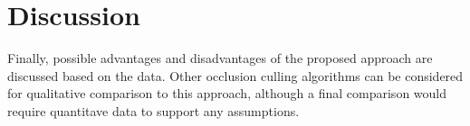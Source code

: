 \chapter{Discussion} \label{cpt-discussion}

Finally, possible advantages and disadvantages of the proposed approach are discussed based on the data.
Other occlusion culling algorithms can be considered for qualitative comparison to this approach, although 
a final comparison would require quantitave data to support any assumptions.\\





%
%
%
